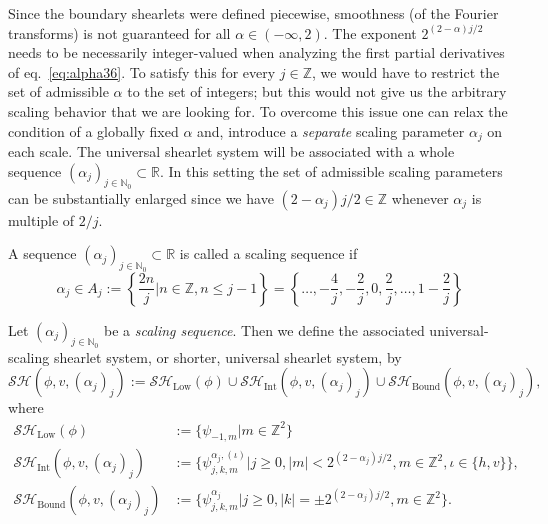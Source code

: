 \bigskip

Since the boundary shearlets were defined piecewise, smoothness (of the Fourier transforms) is not guaranteed for all $\alpha\in (-\infty,2)$. The exponent $2^{(2-\alpha)j/2}$ needs to be necessarily integer-valued when analyzing the first partial derivatives of eq.~\ref{eq:alpha36}. To satisfy this for every $j\in\mathbb{Z}$, we would have to restrict the set of admissible $\alpha$ to the set of integers; but this would not give us the arbitrary scaling behavior that we are looking for. To overcome this issue one can relax the condition of a globally fixed $\alpha$ and, introduce a \textit{separate} scaling parameter $\alpha_j$ on each scale. The universal shearlet system will be associated with a whole sequence $(\alpha_j)_{j\in\mathbb{N}_0}\subset\mathbb{R}$. In this setting the set of admissible scaling parameters can be substantially enlarged since we have $(2-\alpha_j)j/2\in\mathbb{Z}$ whenever $\alpha_j$ is multiple of $2/j$. 

\bigskip

\begin{defn}
\label{def:alpha32}
A sequence $(\alpha_j)_{j\in\mathbb{N}_0}\subset\mathbb{R}$ is called a scaling sequence if 
$$
\alpha_j\in A_j:=\left \{\frac{2n}{j}\big| n\in\mathbb{Z},n\leq j-1\right \}=\left \{\ldots,-\frac{4}{j},-\frac{2}{j},0,\frac{2}{j},\ldots,1-\frac{2}{j}\right \}
$$
\end{defn}

\bigskip

\begin{defn}
\label{def:alpha33}
Let $(\alpha_j)_{j\in\mathbb{N}_0}$ be a \textit{scaling sequence}. Then we define the associated universal-scaling shearlet system, or shorter, universal shearlet system, by
$$
\mathcal{SH}(\phi,v,(\alpha_j)_j):=\mathcal{SH}_{\text{Low}}(\phi)\cup\mathcal{SH}_{\text{Int}}(\phi,v,(\alpha_j)_j)\cup\mathcal{SH}_{\text{Bound}}(\phi,v,(\alpha_j)_j),
$$
where
$$
\begin{aligned}
\mathcal{SH}_{\text{Low}}(\phi)&:=\{\psi_{-1,m}|m\in\mathbb{Z}^2\}\\
\mathcal{SH}_{\text{Int}}(\phi,v,(\alpha_j)_j)&:=\{\psi_{j,k,m}^{\alpha_j,(\iota)}|j\geq 0,|m|< 2^{(2-\alpha_j)j/2},m\in\mathbb{Z}^2,\iota\in\{h,v\}\},\\
\mathcal{SH}_{\text{Bound}}(\phi,v,(\alpha_j)_j)&:=\{\psi_{j,k,m}^{\alpha_j}|j\geq 0,|k|=\pm 2^{(2-\alpha_j)j/2},m\in\mathbb{Z}^2\}.
\end{aligned}
$$

\end{defn}

